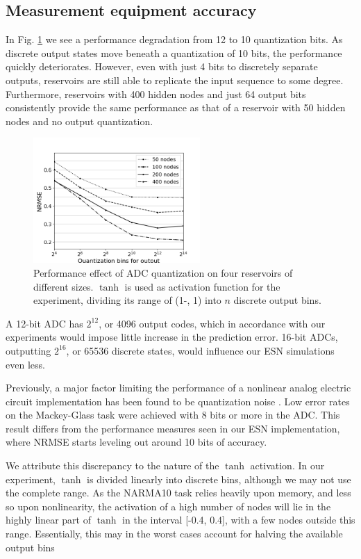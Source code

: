 \subsection{Measurement equipment accuracy}

In Fig. \ref{adc_quantization} we see a performance degradation from 12 to 10
quantization bits. As discrete output states move beneath a quantization of 10
bits, the performance quickly deteriorates. However, even with just 4 bits to
discretely separate outputs, reservoirs are still able to replicate the input
sequence to some degree. Furthermore, reservoirs with 400 hidden nodes and just
64 output bits consistently provide the same performance as that of a reservoir
with 50 hidden nodes and no output quantization.

\begin{figure}[H]
  \centering
  \includegraphics[width=2.5in]{img/adc_quantization.png}
  \caption{
    Performance effect of ADC quantization on four reservoirs of different
sizes. $\tanh$ is used as activation function for the experiment, dividing its
range of (1-, 1) into $n$ discrete output bins.
  }
  \label{adc_quantization}
\end{figure}

A 12-bit ADC has $2^{12}$, or 4096 output codes, which in accordance with our
experiments would impose little increase in the prediction error. 16-bit ADCs,
outputting $2^{16}$, or 65536 discrete states, would influence our ESN
simulations even less.

Previously, a major factor limiting the performance of a nonlinear analog
electric circuit implementation has been found to be quantization noise
\cite{soriano_delay-based_2015}. Low error rates on the Mackey-Glass task were
achieved with 8 bits or more in the ADC. This result differs from the
performance measures seen in our ESN implementation, where NRMSE starts leveling
out around 10 bits of accuracy.

We attribute this discrepancy to the nature of the $\tanh$ activation. In our
experiment, $\tanh$ is divided linearly into discrete bins, although we may not
use the complete range. As the NARMA10 task relies heavily upon memory, and less
so upon nonlinearity, the activation of a high number of nodes will lie in the
highly linear part of $\tanh$ in the interval [-0.4, 0.4], with a few nodes
outside this range. Essentially, this may in the worst cases account for halving
the available output bins


